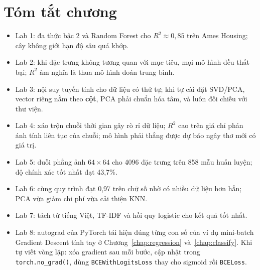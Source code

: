 \section{Tóm tắt chương}
\begin{itemize}
    \item Lab 1: đa thức bậc 2 và Random Forest cho $R^2 \approx 0{,}85$ trên Ames Housing; cây không giới hạn độ sâu quá khớp.
    \item Lab 2: khi đặc trưng không tương quan với mục tiêu, mọi mô hình đều thất bại; $R^2$ âm nghĩa là thua mô hình đoán trung bình.
    \item Lab 3: nội suy tuyến tính cho dữ liệu có thứ tự; khi tự cài đặt SVD/PCA, vector riêng nằm theo \textbf{cột}, PCA phải chuẩn hóa tâm, và luôn đối chiếu với thư viện.
    \item Lab 4: xáo trộn chuỗi thời gian gây rò rỉ dữ liệu; $R^2$ cao trên giá chỉ phản ánh tính liên tục của chuỗi; mô hình phải thắng được dự báo ngây thơ mới có giá trị.
    \item Lab 5: duỗi phẳng ảnh $64 \times 64$ cho 4096 đặc trưng trên 858 mẫu huấn luyện; độ chính xác tốt nhất đạt 43,7\%.
    \item Lab 6: cùng quy trình đạt 0,97 trên chữ số nhờ có nhiều dữ liệu hơn hẳn; PCA vừa giảm chi phí vừa cải thiện KNN.
    \item Lab 7: tách từ tiếng Việt, TF-IDF và hồi quy logistic cho kết quả tốt nhất.
    \item Lab 8: autograd của PyTorch tái hiện đúng từng con số của ví dụ mini-batch Gradient Descent tính tay ở Chương~\ref{chap:regression} và~\ref{chap:classify}. Khi tự viết vòng lặp: xóa gradient sau mỗi bước, cập nhật trong \texttt{torch.no\_grad()}, dùng \texttt{BCEWithLogitsLoss} thay cho sigmoid rồi \texttt{BCELoss}.
\end{itemize}

